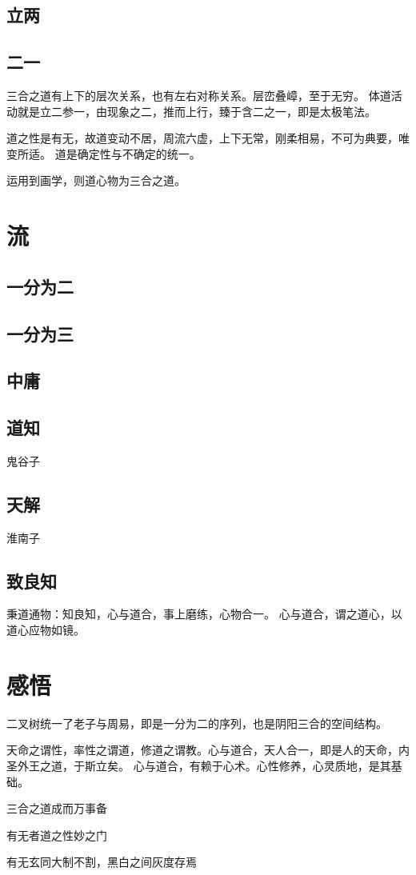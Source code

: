 \subsection{立两}

\subsection{二一}

三合之道有上下的层次关系，也有左右对称关系。层峦叠嶂，至于无穷。
体道活动就是立二参一，由现象之二，推而上行，臻于含二之一，即是太极笔法。

道之性是有无，故道变动不居，周流六虚，上下无常，刚柔相易，不可为典要，唯变所适。
道是确定性与不确定的统一。

运用到画学，则道心物为三合之道。

\section{流}

\subsection{一分为二}

\subsection{一分为三}

\subsection{中庸}

\subsection{道知}

鬼谷子

\subsection{天解}

淮南子

\subsection{致良知}

秉道通物：知良知，心与道合，事上磨练，心物合一。
心与道合，谓之道心，以道心应物如镜。

\section{感悟}

二叉树统一了老子与周易，即是一分为二的序列，也是阴阳三合的空间结构。

天命之谓性，率性之谓道，修道之谓教。心与道合，天人合一，即是人的天命，内圣外王之道，于斯立矣。
心与道合，有赖于心术。心性修养，心灵质地，是其基础。

三合之道成而万事备

有无者道之性妙之门

有无玄同大制不割，黑白之间灰度存焉
